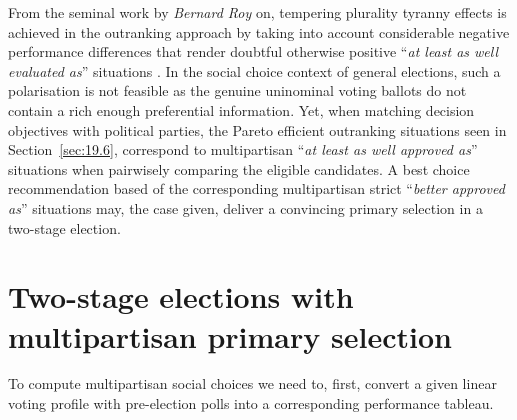 From the seminal work by \emph{Bernard Roy} on, tempering plurality tyranny effects is achieved in the outranking approach by taking into account considerable negative performance differences that render doubtful otherwise positive ``\emph{at least as well evaluated as}'' situations \citep*{ROY-1966}. In the social choice context of general elections, such a polarisation is not feasible as the genuine uninominal voting ballots do not contain a rich enough preferential information. Yet, when matching decision objectives with political parties, the Pareto efficient outranking situations seen in Section~\ref{sec:19.6}, correspond to multipartisan ``\emph{at least as well approved as}'' situations when pairwisely comparing the eligible candidates. A best choice recommendation based of the corresponding multipartisan strict ``\emph{better approved as}'' situations may, the case given, deliver a convincing primary selection in a two-stage election. 

\section{Two-stage elections with multipartisan primary selection}
\label{sec:20.1}

To compute multipartisan social choices we need to, first, convert a given linear voting profile with pre-election polls into a corresponding performance tableau.


